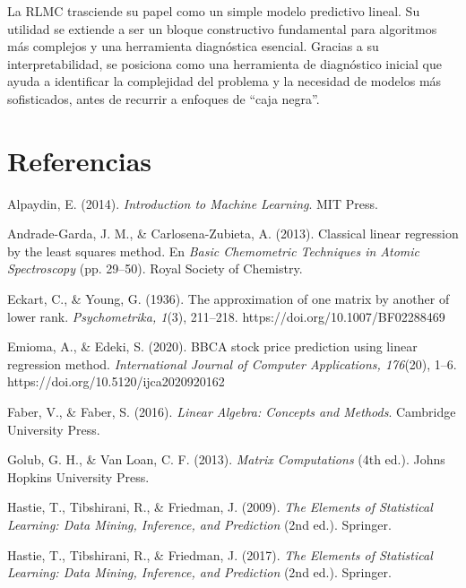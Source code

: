 \documentclass[12pt]{article}
\begin{document}
        \noindent
        La RLMC trasciende su papel como un simple modelo predictivo lineal. Su utilidad se extiende a ser un bloque constructivo fundamental para algoritmos más complejos y una herramienta diagnóstica esencial. Gracias a su interpretabilidad, se posiciona como una herramienta de diagnóstico inicial que ayuda a identificar la complejidad del problema y la necesidad de modelos más sofisticados, antes de recurrir a enfoques de “caja negra”.
        
        \section{Referencias}
        
        \hangindent=0.5in  Alpaydin, E. (2014). \textit{Introduction to Machine Learning}. MIT Press.\par
        \hangindent=0.5in  Andrade-Garda, J. M., \& Carlosena-Zubieta, A. (2013). Classical linear regression by the least squares method. En \textit{Basic Chemometric Techniques in Atomic Spectroscopy} (pp. 29–50). Royal Society of Chemistry.\par
        \hangindent=0.5in  Eckart, C., \& Young, G. (1936). The approximation of one matrix by another of lower rank. \textit{Psychometrika, 1}(3), 211–218. https://doi.org/10.1007/BF02288469\par
        \hangindent=0.5in  Emioma, A., \& Edeki, S. (2020). BBCA stock price prediction using linear regression method. \textit{International Journal of Computer Applications, 176}(20), 1–6. https://doi.org/10.5120/ijca2020920162\par
        \hangindent=0.5in  Faber, V., \& Faber, S. (2016). \textit{Linear Algebra: Concepts and Methods}. Cambridge University Press.\par
        \hangindent=0.5in  Golub, G. H., \& Van Loan, C. F. (2013). \textit{Matrix Computations} (4th ed.). Johns Hopkins University Press.\par
        \hangindent=0.5in  Hastie, T., Tibshirani, R., \& Friedman, J. (2009). \textit{The Elements of Statistical Learning: Data Mining, Inference, and Prediction} (2nd ed.). Springer.\par
        \hangindent=0.5in  Hastie, T., Tibshirani, R., \& Friedman, J. (2017). \textit{The Elements of Statistical Learning: Data Mining, Inference, and Prediction} (2nd ed.). Springer.\par
\end{document}
